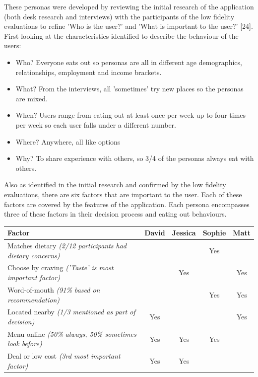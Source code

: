 \documentclass[a4 paper, 12pt]{article}
\begin{document}
    These personas were developed by reviewing the initial research of the application (both desk research and interviews) with the participants of the low fidelity evaluations to refine 'Who is the user?' and 'What is important to the user?' [24]. First looking at the characteristics identified to describe the behaviour of the users:
        \begin{itemize}
            \item Who? Everyone eats out so personas are all in different age demographics, relationships, employment and income brackets.
            \item What? From the interviews, all 'sometimes' try new places so the personas are mixed. 
            \item When? Users range from eating out at least once per week up to four times per week so each user falls under a different number.
            \item Where? Anywhere, all like options
            \item Why? To share experience with others, so 3/4 of the personas always eat with others.
        \end{itemize}

    Also as identified in the initial research and confirmed by the low fidelity evaluations, there are six factors that are important to the user. Each of these factors are covered by the features of the application. Each persona encompasses three of these factors in their decision process and eating out behaviours.
    \begin{center}
    \begin{tabular}{|l|c|c|c|c|}   
        \hline  
        Factor                                                          & David & Jessica& Sophie   & Matt \\
        \hline \hline
        Matches dietary \textit{(2/12 participants had dietary concerns)}&      &       & Yes       &   \\
        \hline
        Choose by craving \textit{('Taste' is most important factor)}   &       & Yes   &           & Yes \\ 
        \hline
        Word-of-mouth \textit{(91\% based on recommendation)}           &       &       & Yes       & Yes \\ 
        \hline
        Located nearby \textit{(1/3 mentioned as part of decision)}     & Yes   &       &           & Yes \\ 
        \hline
        Menu online \textit{(50\% always, 50\% sometimes look before)}  & Yes   & Yes   & Yes       &  \\
        \hline
        Deal or low cost \textit{(3rd most important factor)}           & Yes   & Yes   &           &  \\
        \hline
        \end{tabular}
    \end{center}
    
\end{document}
